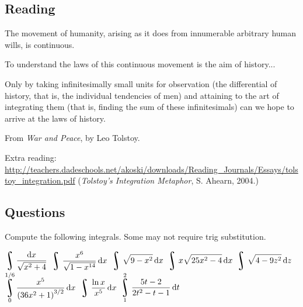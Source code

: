 


\subsection*{Reading}
The movement of humanity, arising as it does from innumerable
arbitrary human wills, is continuous.

To understand the laws of this continuous movement is the aim
of history...

Only by taking infinitesimally small units for observation (the
differential of history, that is, the individual tendencies of men) and
attaining to the art of integrating them (that is, finding the sum of
these infinitesimals) can we hope to arrive at the laws of history.

\begin{flushright}
  From \textit{War and Peace}, by Leo Tolstoy.

  Extra reading: \small{\url{http://teachers.dadeschools.net/akoski/downloads/Reading_Journals/Essays/tolstoy_integration.pdf}}
  (\textit{Tolstoy's Integration Metaphor}, S. Ahearn, 2004.)
\end{flushright}

\subsection*{Questions}
Compute the following integrals. Some may not require trig substitution.
\begin{questions}
  \question $ \displaystyle\rint \frac{\dif{x}}{\sqrt{x^2 + 4}} $
  \question $ \displaystyle\rint \frac{x^6}{\sqrt{1 - x^{14}}} \dif{x} $
  \question $ \displaystyle\rint \sqrt{9 - x^2} \dif{x} $
  \question $ \displaystyle\rint x \sqrt{25x^2 - 4} \dif{x} $
  \question $ \displaystyle\rint \sqrt{4-9z^2} \dif{z} $
  \question $ \displaystyle\rint^{1/6}_0 \frac{x^5}{\left( 36x^2 + 1 \right)^{3/2}} \dif{x} $
  \question $ \displaystyle\rint \frac{\ln x}{x^5} \dif{x} $
  \question $ \displaystyle\rint^2_1 \frac{5t - 2}{2t^2 - t - 1} \dif{t} $
\end{questions}


